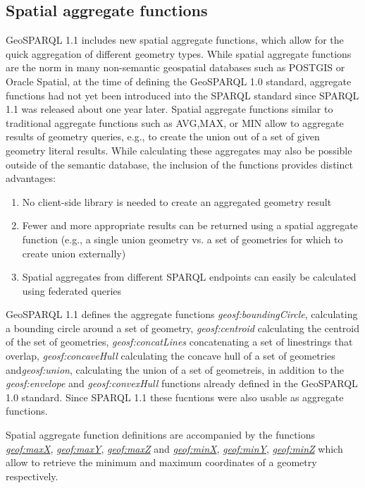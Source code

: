 \documentclass[runningheads]{llncs}
\begin{document}
\subsection{Spatial aggregate functions}\label{sec:spatialaggregate}
GeoSPARQL 1.1 includes new spatial aggregate functions, which allow for the quick aggregation of different geometry types. 
While spatial aggregate functions are the norm in many non-semantic geospatial databases such as POSTGIS or Oracle Spatial, 
at the time of defining the GeoSPARQL 1.0 standard, aggregate functions had not yet been introduced into the SPARQL standard 
since SPARQL 1.1 \cite{w3c_sparql_working_group_sparql_2013} was released about one year later. Spatial aggregate functions 
similar to traditional aggregate functions such as AVG,MAX, or MIN allow to aggregate results of geometry queries, e.g., to 
create the union out of a set of given geometry literal results. While calculating these aggregates may also be possible 
outside of the semantic database, the inclusion of the functions provides distinct advantages:
\begin{enumerate}
    \item No client-side library is needed to create an aggregated geometry result
    \item Fewer and more appropriate results can be returned using a spatial aggregate function (e.g., a single union geometry vs. a set of geometries for which to create union externally)
    \item Spatial aggregates from different SPARQL endpoints can easily be calculated using federated queries 
\end{enumerate}
GeoSPARQL 1.1 defines the aggregate functions \emph{geosf:boundingCircle}, calculating a bounding circle around a set of 
geometry, \emph{geosf:centroid} calculating the centroid of the set of geometries, \emph{geosf:concatLines} concatenating 
a set of linestrings that overlap, \emph{geosf:concaveHull} calculating the concave hull of a set of geometries and\emph{geosf:union}, 
calculating the union of a set of geometreis, in addition to the \emph{geosf:envelope} and \emph{geosf:convexHull} functions 
already defined in the GeoSPARQL 1.0 standard. Since SPARQL 1.1 these fucntions were also usable as aggregate functions.

Spatial aggregate function definitions are accompanied by the functions \href{http://www.opengis.net/def/function/geosparql/maxX}{\emph{geof:maxX}}, 
\href{http://www.opengis.net/def/function/geosparql/maxY}{\emph{geof:maxY}}, \href{http://www.opengis.net/def/function/geosparql/maxZ}{\emph{geof:maxZ}} 
and \href{http://www.opengis.net/def/function/geosparql/minX}{\emph{geof:minX}}, \href{http://www.opengis.net/def/function/geosparql/minY}{\emph{geof:minY}}, 
\href{http://www.opengis.net/def/function/geosparql/minZ}{\emph{geof:minZ}} which allow to retrieve the minimum and maximum 
coordinates of a geometry respectively.
\end{document}
